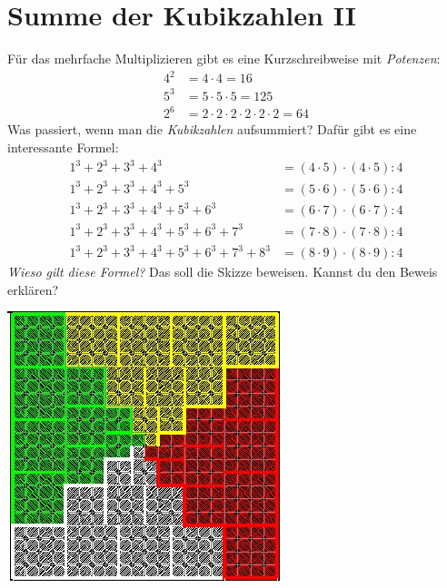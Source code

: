 \documentclass{../../zirkelblatt}
\begin{document}
\vfill
\section*{Summe der Kubikzahlen II}
Für das mehrfache Multiplizieren gibt es eine Kurzschreibweise mit \emph{Potenzen}:
\begin{align*}
  4^2 &= 4 \cdot 4 = 16 \\
  5^3 &= 5 \cdot 5 \cdot 5 = 125 \\
  2^6 &= 2 \cdot 2 \cdot 2 \cdot 2 \cdot 2 \cdot 2 = 64
\end{align*}
Was passiert, wenn man die \emph{Kubikzahlen} aufsummiert? Dafür gibt es
eine interessante Formel:
\begin{align*}
  1^3 + 2^3 + 3^3 + 4^3 \phantom{{} + 5^3 + 6^3 + 7^3 + 8^3} &= (4 \cdot 5) \cdot (4 \cdot 5) : 4 \\
  1^3 + 2^3 + 3^3 + 4^3 + 5^3 \phantom{{} + 6^3 + 7^3 + 8^3} &= (5 \cdot 6) \cdot (5 \cdot 6) : 4 \\
  1^3 + 2^3 + 3^3 + 4^3 + 5^3 + 6^3 \phantom{{} + 7^3 + 8^3} &= (6 \cdot 7) \cdot (6 \cdot 7) : 4 \\
  1^3 + 2^3 + 3^3 + 4^3 + 5^3 + 6^3 + 7^3 \phantom{{} + 8^3} &= (7 \cdot 8) \cdot (7 \cdot 8) : 4 \\
  1^3 + 2^3 + 3^3 + 4^3 + 5^3 + 6^3 + 7^3 + 8^3 &= (8 \cdot 9) \cdot (8 \cdot 9) : 4
\end{align*}
\emph{Wieso gilt diese Formel?} Das soll die Skizze beweisen. Kannst du den
Beweis erklären?
\begin{center}
\includegraphics[scale=0.7]{kubikzahlen-2}
\end{center}


\vfill
\end{document}
